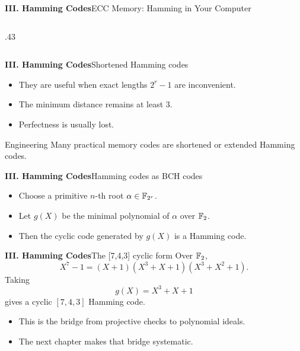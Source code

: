 \begin{frame}{\textbf{III. Hamming Codes}}{ECC Memory: Hamming in Your Computer}
\begin{columns}[T,onlytextwidth]
\begin{column}{.43\textwidth}
  \end{column}
\end{columns}
\end{frame}

\begin{frame}{\textbf{III. Hamming Codes}}{Shortened Hamming codes}
\small
{}
\begin{itemize}
  \item They are useful when exact lengths $2^r-1$ are inconvenient.
  \item The minimum distance remains at least $3$.
  \item Perfectness is usually lost.
\end{itemize}
\begin{block}{Engineering}
Many practical memory codes are shortened or extended Hamming codes.
\end{block}
\end{frame}

\begin{frame}{\textbf{III. Hamming Codes}}{Hamming codes as BCH codes}
\small
{}
\begin{itemize}
  \item Choose a primitive $n$-th root $\alpha\in\mathbb{F}_{2^r}$.
  \item Let $g(X)$ be the minimal polynomial of $\alpha$ over $\mathbb{F}_2$.
  \item Then the cyclic code generated by $g(X)$ is a Hamming code.
\end{itemize}
\end{frame}

\begin{frame}{\textbf{III. Hamming Codes}}{The [7,4,3] cyclic form}
\small
Over $\mathbb{F}_2$,
\[
  X^7-1=(X+1)(X^3+X+1)(X^3+X^2+1).
\]
Taking
\[
  g(X)=X^3+X+1
\]
gives a cyclic $[7,4,3]$ Hamming code.
\begin{itemize}
  \item This is the bridge from projective checks to polynomial ideals.
  \item The next chapter makes that bridge systematic.
\end{itemize}
\end{frame}

